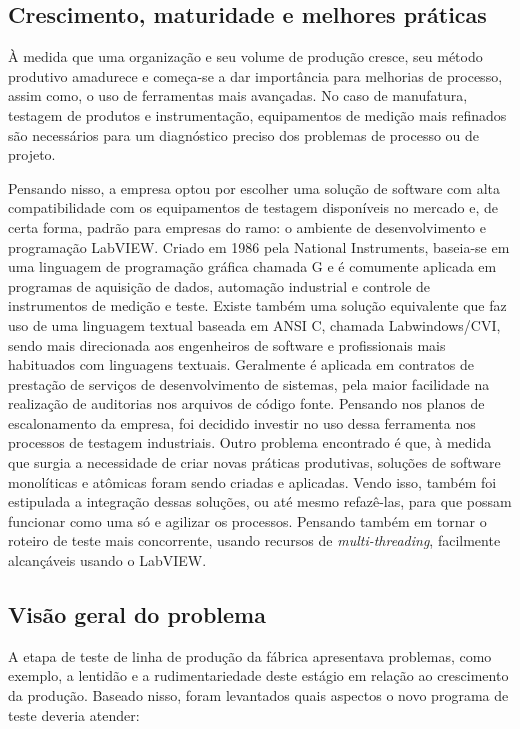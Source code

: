     \subsection{Crescimento, maturidade e melhores práticas}
    
        À medida que uma organização e seu volume de produção cresce, seu método produtivo amadurece e começa-se a dar importância para melhorias de processo, assim como, o uso de ferramentas mais avançadas. No caso de manufatura, testagem de produtos e instrumentação, equipamentos de medição mais refinados são necessários para um diagnóstico preciso dos problemas de processo ou de projeto.
        
        Pensando nisso, a empresa optou por escolher uma solução de software com alta compatibilidade com os equipamentos de testagem disponíveis no mercado e, de certa forma, padrão para empresas do ramo: o ambiente de desenvolvimento e programação LabVIEW. Criado em 1986 pela National Instruments, baseia-se em uma linguagem de programação gráfica chamada G e é comumente aplicada em programas de aquisição de dados, automação industrial e controle de instrumentos de medição e teste. Existe também uma solução equivalente que faz uso de uma linguagem textual baseada em ANSI C, chamada Labwindows/CVI, sendo mais direcionada aos engenheiros de software e profissionais mais habituados com linguagens textuais. Geralmente é aplicada em contratos de prestação de serviços de desenvolvimento de sistemas, pela maior facilidade na realização de auditorias nos arquivos de código fonte. Pensando nos planos de escalonamento da empresa, foi decidido investir no uso dessa ferramenta nos processos de testagem industriais.
        Outro problema encontrado é que, à medida que surgia a necessidade de criar novas práticas produtivas, soluções de software monolíticas e atômicas foram sendo criadas e aplicadas. Vendo isso, também foi estipulada a integração dessas soluções, ou até mesmo refazê-las, para que possam funcionar como uma só e agilizar os processos. Pensando também em tornar o roteiro de teste mais concorrente, usando recursos de \textit{multi-threading}, facilmente alcançáveis usando o LabVIEW. 
    \subsection{Visão geral do problema}
        
        A etapa de teste de linha de produção da fábrica apresentava problemas, como exemplo, a lentidão e a rudimentariedade deste estágio em relação ao crescimento da produção. Baseado nisso, foram levantados quais aspectos o novo programa de teste deveria atender:
        
